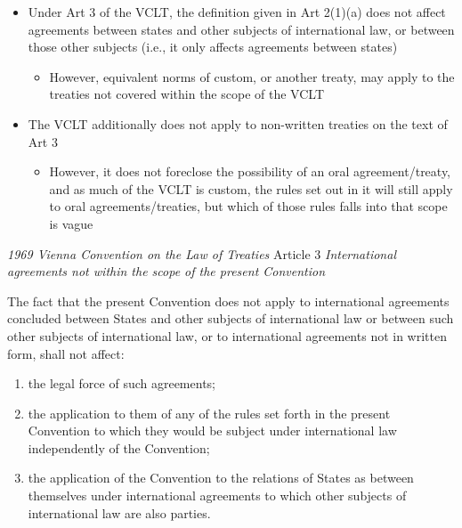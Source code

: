 \begin{itemize}
    \item Under Art 3 of the VCLT, the definition given in Art 2(1)(a) does not affect agreements between states and other subjects of international law, or between those other subjects (i.e., it only affects agreements between states)
    \begin{itemize}
        \item However, equivalent norms of custom, or another treaty, may apply to the treaties not covered within the scope of the VCLT
    \end{itemize}
    \item The VCLT additionally does not apply to non-written treaties on the text of Art 3
    \begin{itemize}
        \item However, it does not foreclose the possibility of an oral agreement/treaty, and as much of the VCLT is custom, the rules set out in it will still apply to oral agreements/treaties, but which of those rules falls into that scope is vague
    \end{itemize}
\end{itemize}

\begin{conventiondetails}{\textit{1969 Vienna Convention on the Law of Treaties} Article 3}\label{VCLT Art 3}
    \flushleft
    \textit{International agreements not within the scope of the present Convention}

    \vspace{\baselineskip}

    The fact that the present Convention does not apply to international agreements concluded between States and other subjects of international law or between such other subjects of international law, or to international agreements not in written form, shall not affect:
    \begin{enumerate}[label=(\alph*)]
        \item the legal force of such agreements; 
        \item the application to them of any of the rules set forth in the present Convention to which they would be subject under international law independently of the Convention; 
        \item the application of the Convention to the relations of States as between themselves under international agreements to which other subjects of international law are also parties.
    \end{enumerate}
\end{conventiondetails}

